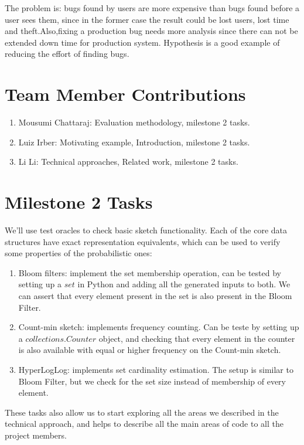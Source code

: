 \documentclass[preprint,nocopyrightspace]{sig-alternate}
\begin{document}
The problem is:
bugs found by users are more expensive than bugs found before a user sees them,
since in the former case the result could be lost users,
lost time and theft.Also,fixing a production bug needs more analysis since 
there can not be extended down time for production system.
Hypothesis is a good example of reducing the effort of finding bugs.

\section{Team Member Contributions}

\begin{enumerate}
\item[] Mousumi Chattaraj: Evaluation methodology, milestone 2 tasks.
\item[] Luiz Irber: Motivating example, Introduction, milestone 2 tasks.
\item[] Li Li: Technical approaches, Related work, milestone 2 tasks.
\end{enumerate}

\section{Milestone 2 Tasks}

We'll use test oracles to check basic sketch functionality.
Each of the core data structures have exact representation equivalents,
which can be used to verify some properties of the probabilistic ones:
\begin{enumerate}
\item Bloom filters: implement the set membership operation,
can be tested by setting up a $set$ in Python and adding all the generated inputs to both.
We can assert that every element present in the set is also present in the Bloom Filter.
\item Count-min sketch: implements frequency counting.
Can be teste by setting up a $collections.Counter$ object,
and checking that every element in the counter is also available with equal or higher frequency on the Count-min sketch.
\item HyperLogLog: implements set cardinality estimation.
The setup is similar to Bloom Filter,
but we check for the set size instead of membership of every element.
\end{enumerate}

These tasks also allow us to start exploring all the areas we described in the technical approach,
and helps to describe all the main areas of code to all the project members.


\end{document}
